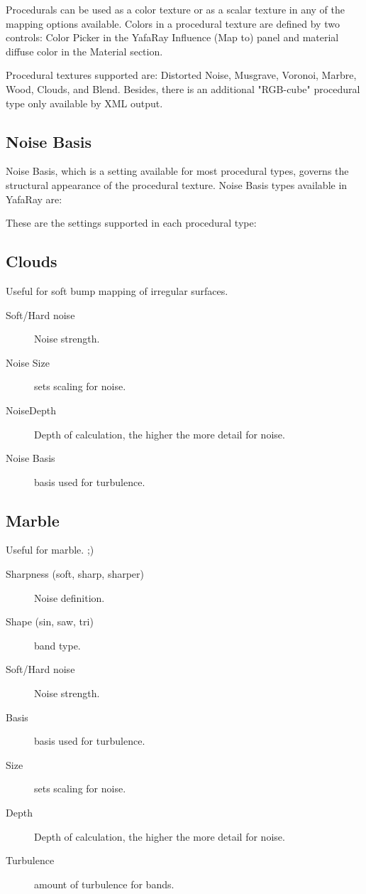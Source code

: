 Procedurals can be used as a color texture or as a scalar texture in any of the mapping options available. Colors in a procedural texture are defined by two controls: Color Picker in the YafaRay Influence (Map to) panel and material diffuse color in the Material section.

Procedural textures supported are: Distorted Noise, Musgrave, Voronoi, Marbre, Wood, Clouds, and Blend. Besides, there is an additional "RGB-cube" procedural type only available by XML output.
\subsection{Noise Basis}

Noise Basis, which is a setting available for most procedural types, governs the structural appearance of the procedural texture. Noise Basis types available in YafaRay are:

These are the settings supported in each procedural type:
\subsection{Clouds}

Useful for soft bump mapping of irregular surfaces.
\begin{description}
\item[Soft/Hard noise] Noise strength.
\item[Noise Size] sets scaling for noise.
\item[NoiseDepth] Depth of calculation, the higher the more detail for noise.
\item[Noise Basis] basis used for turbulence.
\end{description}

\subsection{Marble}

Useful for marble. ;)

\begin{description}
\item[Sharpness (soft, sharp, sharper)] Noise definition.
\item[Shape (sin, saw, tri)] band type.
\item[Soft/Hard noise] Noise strength.
\item[Basis] basis used for turbulence.
\item[Size] sets scaling for noise.
\item[Depth] Depth of calculation, the higher the more detail for noise.
\item[Turbulence] amount of turbulence for bands.
\end{description}

